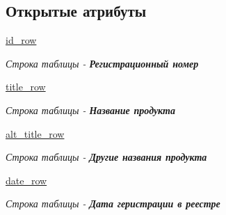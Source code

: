 \subsection*{Открытые атрибуты}
\begin{DoxyCompactItemize}
\item 
\mbox{\label{classCsvWriter_1_1CsvWriter_a7900ae93bb5ed7cf1896056c3f58e1d5}} 
\hyperlink{classCsvWriter_1_1CsvWriter_a7900ae93bb5ed7cf1896056c3f58e1d5}{id\+\_\+row}
\begin{DoxyCompactList}\small\item\em Строка таблицы -\/ {\itshape {\bfseries Регистрационный номер}} \end{DoxyCompactList}\item 
\mbox{\label{classCsvWriter_1_1CsvWriter_ae5e24b59bde75109c2ea93bbf7e69ddb}} 
\hyperlink{classCsvWriter_1_1CsvWriter_ae5e24b59bde75109c2ea93bbf7e69ddb}{title\+\_\+row}
\begin{DoxyCompactList}\small\item\em Строка таблицы -\/ {\itshape {\bfseries Название продукта}} \end{DoxyCompactList}\item 
\mbox{\label{classCsvWriter_1_1CsvWriter_a112e224f259e3bcce3a81540b195857d}} 
\hyperlink{classCsvWriter_1_1CsvWriter_a112e224f259e3bcce3a81540b195857d}{alt\+\_\+title\+\_\+row}
\begin{DoxyCompactList}\small\item\em Строка таблицы -\/ {\itshape {\bfseries Другие названия продукта}} \end{DoxyCompactList}\item 
\mbox{\label{classCsvWriter_1_1CsvWriter_a9b4127aab4f2b7db22c1f1d6fb86ac2c}} 
\hyperlink{classCsvWriter_1_1CsvWriter_a9b4127aab4f2b7db22c1f1d6fb86ac2c}{date\+\_\+row}
\begin{DoxyCompactList}\small\item\em Строка таблицы -\/ {\itshape {\bfseries Дата геристрации в реестре}} \end{DoxyCompactList}\item 
\mbox{\label{classCsvWriter_1_1CsvWriter_ace04c34812ce9261cafeda325461fa56}} 

\end{DoxyCompactItemize}
